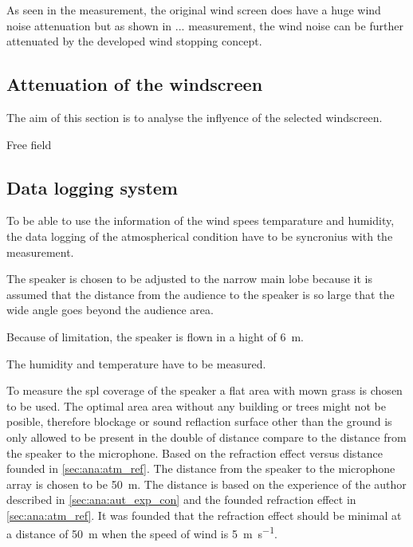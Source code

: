 As seen in the measurement, the original wind screen does have a huge wind noise attenuation but as shown in ... measurement, the wind noise can be further attenuated by the developed wind stopping concept. 




\subsection{Attenuation of the windscreen} 
The aim of this section is to analyse the inflyence of the selected windscreen. 






Free field 



\subsection{Data logging system} 

To be able to use the information of the wind spees temparature and humidity, the data logging of the atmospherical condition have to be syncronius with the measurement. 




The speaker is chosen to be adjusted to the narrow main lobe because it is assumed that the distance from the audience to the speaker is so large that the wide angle goes beyond the audience area.

Because of limitation, the speaker is flown in a hight of \SI{6}{\meter}. 

The humidity and temperature have to be measured.

To measure the \gls{spl} coverage of the speaker a flat area with mown grass is chosen to be used. The optimal area area without any building or trees might not be posible, therefore blockage or sound reflaction surface other than the ground is only allowed to be present in the double of distance compare to the distance from the speaker to the microphone. Based on the refraction effect versus distance founded in \autoref{sec:ana:atm_ref}. The distance from the speaker to the microphone array is chosen to be \SI{50}{\meter}. The distance is based on the experience of the author described in \autoref{sec:ana:aut_exp_con} and the founded refraction effect in \autoref{sec:ana:atm_ref}. It was founded that the refraction effect should be minimal at a distance of \SI{50}{\meter} when the speed of wind is \SI{5}{\meter\per\second}. 


